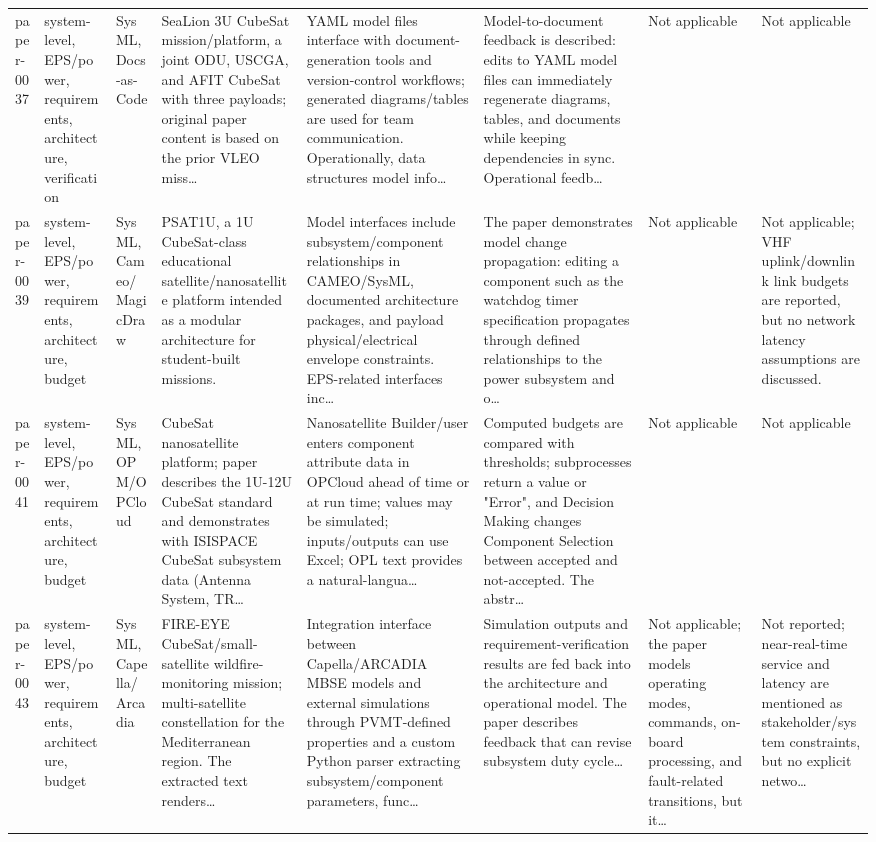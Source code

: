\documentclass[10pt]{article}
\begin{document}
\begin{landscape}
\begin{longtable}{p{1.1cm}p{3.1cm}p{2.5cm}p{3.3cm}p{4.0cm}p{3.5cm}p{2.8cm}p{2.8cm}}
paper-0037 & system-level, EPS/power, requirements, architecture, verification & SysML, Docs-as-Code & SeaLion 3U CubeSat mission/platform, a joint ODU, USCGA, and AFIT CubeSat with three payloads; original paper content is based on the prior VLEO miss… & YAML model files interface with document-generation tools and version-control workflows; generated diagrams/tables are used for team communication. Operationally, data structures model info… & Model-to-document feedback is described: edits to YAML model files can immediately regenerate diagrams, tables, and documents while keeping dependencies in sync. Operational feedb… & Not applicable & Not applicable \\
paper-0039 & system-level, EPS/power, requirements, architecture, budget & SysML, Cameo/MagicDraw & PSAT1U, a 1U CubeSat-class educational satellite/nanosatellite platform intended as a modular architecture for student-built missions. & Model interfaces include subsystem/component relationships in CAMEO/SysML, documented architecture packages, and payload physical/electrical envelope constraints. EPS-related interfaces inc… & The paper demonstrates model change propagation: editing a component such as the watchdog timer specification propagates through defined relationships to the power subsystem and o… & Not applicable & Not applicable; VHF uplink/downlink link budgets are reported, but no network latency assumptions are discussed. \\
paper-0041 & system-level, EPS/power, requirements, architecture, budget & SysML, OPM/OPCloud & CubeSat nanosatellite platform; paper describes the 1U-12U CubeSat standard and demonstrates with ISISPACE CubeSat subsystem data (Antenna System, TR… & Nanosatellite Builder/user enters component attribute data in OPCloud ahead of time or at run time; values may be simulated; inputs/outputs can use Excel; OPL text provides a natural-langua… & Computed budgets are compared with thresholds; subprocesses return a value or "Error", and Decision Making changes Component Selection between accepted and not-accepted. The abstr… & Not applicable & Not applicable \\
paper-0043 & system-level, EPS/power, requirements, architecture, budget & SysML, Capella/Arcadia & FIRE-EYE CubeSat/small-satellite wildfire-monitoring mission; multi-satellite constellation for the Mediterranean region. The extracted text renders… & Integration interface between Capella/ARCADIA MBSE models and external simulations through PVMT-defined properties and a custom Python parser extracting subsystem/component parameters, func… & Simulation outputs and requirement-verification results are fed back into the architecture and operational model. The paper describes feedback that can revise subsystem duty cycle… & Not applicable; the paper models operating modes, commands, on-board processing, and fault-related transitions, but it… & Not reported; near-real-time service and latency are mentioned as stakeholder/system constraints, but no explicit netwo… \\

\end{longtable}
\end{landscape}
\end{document}
